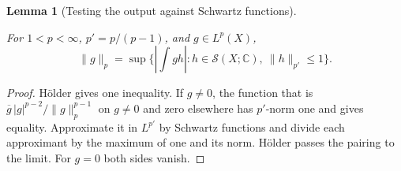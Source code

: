 \documentclass[11pt,letterpaper]{article}
\newtheorem{lemma}[theorem]{Lemma}
\theoremstyle{definition}
\newcommand{\C}{\mathbb C}
\newcommand{\norm}[1]{\lVert#1\rVert}
\newcommand{\Sch}{\mathcal S}
\providecommand{\lean}[1]{}
\begin{document}
\begin{lemma}[Testing the output against Schwartz functions]\label{bp:dual}
\lean{TwistedParaproduct.dual}
For \(1<p<\infty\), \(p'=p/(p-1)\), and \(g\in L^p(X)\),
\[
 \norm g_p=\sup\{|\textstyle\int gh|:
                       h\in\Sch(X;\C),\ \norm h_{p'}\le1\}.
\]
\end{lemma}
\begin{proof}
H\"older gives one inequality. If \(g\ne0\), the function that is
\(\overline g\,|g|^{p-2}/\norm g_p^{p-1}\) on \(g\ne0\) and zero
elsewhere has \(p'\)-norm one and gives equality. Approximate it in
\(L^{p'}\) by Schwartz functions and divide each approximant by the
maximum of one and its norm. H\"older passes the pairing to the limit.
For \(g=0\) both sides vanish.
\end{proof}
\end{document}
